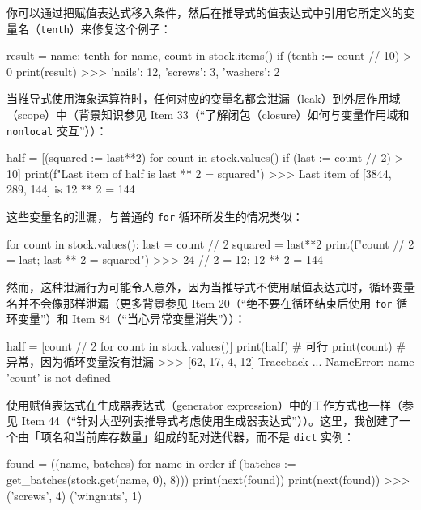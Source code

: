 你可以通过把赋值表达式移入条件，然后在推导式的值表达式中引用它所定义的变量名（\texttt{tenth}）来修复这个例子：

\begin{codebox}[python]
result = {name: tenth for name, count in stock.items()
          if (tenth := count // 10) > 0}
print(result)
>>>
{'nails': 12, 'screws': 3, 'washers': 2}
\end{codebox}

当推导式使用海象运算符时，任何对应的变量名都会泄漏（leak）到外层作用域（scope）中（背景知识参见 Item 33（``了解闭包（closure）如何与变量作用域和 \texttt{nonlocal} 交互''））：

\begin{codebox}[python]
half = [(squared := last**2)
        for count in stock.values()
        if (last := count // 2) > 10]
print(f"Last item of {half} is {last} ** 2 = {squared}")
>>>
Last item of [3844, 289, 144] is 12 ** 2 = 144
\end{codebox}

这些变量名的泄漏，与普通的 \texttt{for} 循环所发生的情况类似：

\begin{codebox}[python]
for count in stock.values():
    last = count // 2
    squared = last**2
print(f"{count} // 2 = {last}; {last} ** 2 = {squared}")
>>>
24 // 2 = 12; 12 ** 2 = 144
\end{codebox}

然而，这种泄漏行为可能令人意外，因为当推导式不使用赋值表达式时，循环变量名并不会像那样泄漏（更多背景参见 Item 20（``绝不要在循环结束后使用 \texttt{for} 循环变量''）和 Item 84（``当心异常变量消失''））：

\begin{codebox}[python]
half = [count // 2 for count in stock.values()]
print(half)   # 可行
print(count)  # 异常，因为循环变量没有泄漏
>>>
[62, 17, 4, 12]
Traceback ...
NameError: name 'count' is not defined
\end{codebox}

使用赋值表达式在生成器表达式（generator expression）中的工作方式也一样（参见 Item 44（``针对大型列表推导式考虑使用生成器表达式''））。这里，我创建了一个由「项名和当前库存数量」组成的配对迭代器，而不是 \texttt{dict} 实例：

\begin{codebox}[python]
found = ((name, batches) for name in order
         if (batches := get_batches(stock.get(name, 0), 8)))
print(next(found))
print(next(found))
>>>
('screws', 4)
('wingnuts', 1)
\end{codebox}

